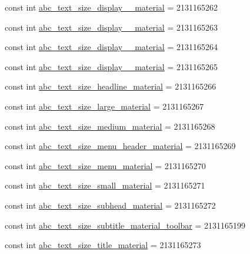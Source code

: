 \begin{CompactItemize}
\item 
const int \hyperlink{class__2doo_1_1_droid_1_1_resource_1_1_dimension_55d724185b51a45071de7081de86fd05}{abc\_\-text\_\-size\_\-display\_\_\-material} = 2131165262
\item 
const int \hyperlink{class__2doo_1_1_droid_1_1_resource_1_1_dimension_10906e79ac41979f0b9821bdcb595f8c}{abc\_\-text\_\-size\_\-display\_\_\-material} = 2131165263
\item 
const int \hyperlink{class__2doo_1_1_droid_1_1_resource_1_1_dimension_ebdefb809b327c41c8eb09c265ca9729}{abc\_\-text\_\-size\_\-display\_\_\-material} = 2131165264
\item 
const int \hyperlink{class__2doo_1_1_droid_1_1_resource_1_1_dimension_fa40f342dd7ff7e09cd715c8b611a250}{abc\_\-text\_\-size\_\-display\_\_\-material} = 2131165265
\item 
const int \hyperlink{class__2doo_1_1_droid_1_1_resource_1_1_dimension_8221ff662a914b285f205684a3590979}{abc\_\-text\_\-size\_\-headline\_\-material} = 2131165266
\item 
const int \hyperlink{class__2doo_1_1_droid_1_1_resource_1_1_dimension_bfa9decf670b12585e0001de170e4efa}{abc\_\-text\_\-size\_\-large\_\-material} = 2131165267
\item 
const int \hyperlink{class__2doo_1_1_droid_1_1_resource_1_1_dimension_b56c1498722e56d8ef2f91db98e773c3}{abc\_\-text\_\-size\_\-medium\_\-material} = 2131165268
\item 
const int \hyperlink{class__2doo_1_1_droid_1_1_resource_1_1_dimension_e5d4151d7726ad82ceae2c5561fe73f0}{abc\_\-text\_\-size\_\-menu\_\-header\_\-material} = 2131165269
\item 
const int \hyperlink{class__2doo_1_1_droid_1_1_resource_1_1_dimension_bad1711990a679180ed681fbfd8cec8b}{abc\_\-text\_\-size\_\-menu\_\-material} = 2131165270
\item 
const int \hyperlink{class__2doo_1_1_droid_1_1_resource_1_1_dimension_88e4b7ad44a0a12c05ed312f667708d0}{abc\_\-text\_\-size\_\-small\_\-material} = 2131165271
\item 
const int \hyperlink{class__2doo_1_1_droid_1_1_resource_1_1_dimension_43d7aac33fc83c7777dbac3d71278d1b}{abc\_\-text\_\-size\_\-subhead\_\-material} = 2131165272
\item 
const int \hyperlink{class__2doo_1_1_droid_1_1_resource_1_1_dimension_ce1ac968722faf2687cc53a82a6748d9}{abc\_\-text\_\-size\_\-subtitle\_\-material\_\-toolbar} = 2131165199
\item 
const int \hyperlink{class__2doo_1_1_droid_1_1_resource_1_1_dimension_7f34951af0cae169cdf3ee3a02d14779}{abc\_\-text\_\-size\_\-title\_\-material} = 2131165273

\end{CompactItemize}
